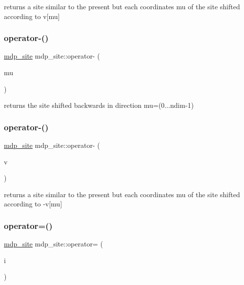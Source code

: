 returns a site similar to the present but each coordinates mu of the site shifted according to v\mbox{[}mu\mbox{]} \mbox{\label{classmdp__site_a3dceebe7dec6a488314064cee7ef8d80}} 
\subsubsection{\texorpdfstring{operator-\/()}{operator-()}\hspace{0.1cm}{\footnotesize\ttfamily [1/2]}}
{\footnotesize\ttfamily \hyperlink{classmdp__site}{mdp\+\_\+site} mdp\+\_\+site\+::operator-\/ (\begin{DoxyParamCaption}\item[{int}]{mu }\end{DoxyParamCaption})\hspace{0.3cm}{\ttfamily [inline]}}



returns the site shifted backwards in direction mu=(0...ndim-\/1) 

\mbox{\label{classmdp__site_a20d26e5db480233e64bde96eb67180fc}} 
\subsubsection{\texorpdfstring{operator-\/()}{operator-()}\hspace{0.1cm}{\footnotesize\ttfamily [2/2]}}
{\footnotesize\ttfamily \hyperlink{classmdp__site}{mdp\+\_\+site} mdp\+\_\+site\+::operator-\/ (\begin{DoxyParamCaption}\item[{\hyperlink{classmdp__vector}{mdp\+\_\+vector}}]{v }\end{DoxyParamCaption})\hspace{0.3cm}{\ttfamily [inline]}}

returns a site similar to the present but each coordinates mu of the site shifted according to -\/v\mbox{[}mu\mbox{]} \mbox{\label{classmdp__site_ab54108d3429bf4edb3d2434545a425c2}} 
\subsubsection{\texorpdfstring{operator=()}{operator=()}\hspace{0.1cm}{\footnotesize\ttfamily [1/4]}}
{\footnotesize\ttfamily \hyperlink{classmdp__site}{mdp\+\_\+site} mdp\+\_\+site\+::operator= (\begin{DoxyParamCaption}\item[{\hyperlink{mdp__global__vars_8h_aaa1ad9d0dcd2124aa5af0120d9954174}{mdp\+\_\+int}}]{i }\end{DoxyParamCaption})\hspace{0.3cm}{\ttfamily [inline]}}

